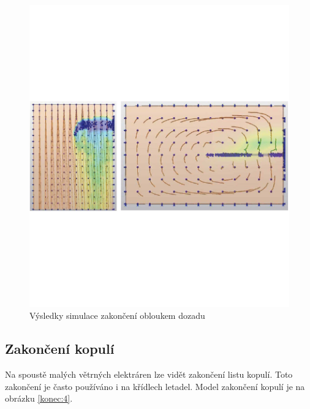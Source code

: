 \begin{figure}[H]
	\centering
	\includegraphics[]{obrazky/simulace/simulace9p}
	\caption{Výsledky simulace zakončení obloukem dozadu}
	\label{sim:9}
\end{figure}

\subsection{Zakončení kopulí}
Na spoustě malých větrných elektráren lze vidět zakončení listu kopulí. Toto zakončení je často používáno i na křídlech letadel. Model zakončení kopulí je na obrázku \ref{konec:4}.

